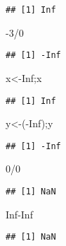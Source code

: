 \documentclass[
]{book}
\newenvironment{Shaded}{\begin{snugshade}}{\end{snugshade}}
\newcommand{\ConstantTok}[1]{\textcolor[rgb]{0.00,0.00,0.00}{#1}}
\newcommand{\DecValTok}[1]{\textcolor[rgb]{0.00,0.00,0.81}{#1}}
\newcommand{\NormalTok}[1]{#1}
\newcommand{\OtherTok}[1]{\textcolor[rgb]{0.56,0.35,0.01}{#1}}
\newcommand{\SpecialCharTok}[1]{\textcolor[rgb]{0.00,0.00,0.00}{#1}}
\begin{document}
\begin{verbatim}
## [1] Inf
\end{verbatim}

\begin{Shaded}
\begin{Highlighting}[]
\SpecialCharTok{{-}}\DecValTok{3}\SpecialCharTok{/}\DecValTok{0}
\end{Highlighting}
\end{Shaded}

\begin{verbatim}
## [1] -Inf
\end{verbatim}

\begin{Shaded}
\begin{Highlighting}[]
\NormalTok{x}\OtherTok{\textless{}{-}}\ConstantTok{Inf}\NormalTok{;x}
\end{Highlighting}
\end{Shaded}

\begin{verbatim}
## [1] Inf
\end{verbatim}

\begin{Shaded}
\begin{Highlighting}[]
\NormalTok{y}\OtherTok{\textless{}{-}}\NormalTok{(}\SpecialCharTok{{-}}\ConstantTok{Inf}\NormalTok{);y}
\end{Highlighting}
\end{Shaded}

\begin{verbatim}
## [1] -Inf
\end{verbatim}

\begin{Shaded}
\begin{Highlighting}[]
\DecValTok{0}\SpecialCharTok{/}\DecValTok{0}
\end{Highlighting}
\end{Shaded}

\begin{verbatim}
## [1] NaN
\end{verbatim}

\begin{Shaded}
\begin{Highlighting}[]
\ConstantTok{Inf}\SpecialCharTok{{-}}\ConstantTok{Inf}
\end{Highlighting}
\end{Shaded}

\begin{verbatim}
## [1] NaN
\end{verbatim}
\end{document}
